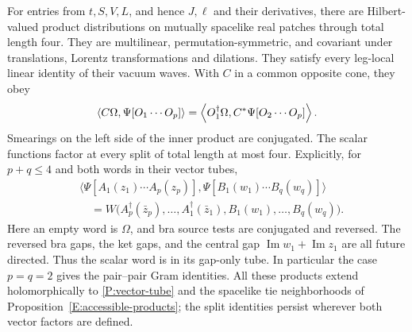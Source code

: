 \begin{proposition}
\label{P:short-products}
For entries from $t,S,V,L$, and hence $J,\ell$ and their derivatives,
there are Hilbert-valued product distributions on mutually spacelike
real patches through total length four.  They are multilinear,
permutation-symmetric, and covariant under translations, Lorentz
transformations and dilations.  They satisfy every leg-local linear
identity of their vacuum waves.  With $C$ in a common opposite cone,
they obey
\begin{equation}
 \left\langle C\Omega,\Psi[O_1\cdots O_p]\right\rangle
 =\left\langle O_1^\dagger\Omega,C^*\Psi[O_2\cdots O_p]\right\rangle.
 \label{P:recursive-product}
\end{equation}
Smearings on the left side of the inner product are conjugated.
The scalar functions factor at every split of total length at most
four.  Explicitly, for $p+q\leq4$ and both words in their vector tubes,
\begin{equation}\label{P:short-splitting}
 \begin{split}
 &\big\langle\Psi[A_1(z_1)\cdots A_p(z_p)],
                  \Psi[B_1(w_1)\cdots B_q(w_q)]\big\rangle\\
 &\quad=W\bigl(A_p^\dagger(\bar z_p),\ldots,
               A_1^\dagger(\bar z_1),B_1(w_1),\ldots,B_q(w_q)\bigr).
 \end{split}
\end{equation}
Here an empty word is $\Omega$, and bra source tests are conjugated
and reversed.  The reversed bra gaps, the ket gaps, and the central
gap $\operatorname{Im}w_1+\operatorname{Im}z_1$ are all future
directed.  Thus the scalar word is in its gap-only tube.  In particular
the case $p=q=2$ gives the pair--pair Gram identities.  All these
products extend holomorphically to
\eqref{P:vector-tube} and the spacelike tie neighborhoods of
Proposition~\ref{E:accessible-products}; the split identities persist
wherever both vector factors are defined.
\end{proposition}

